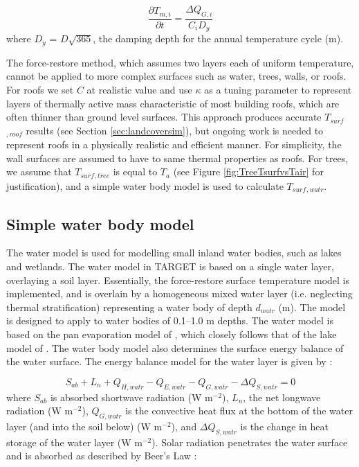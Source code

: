 \documentclass[journal abbreviation, manuscript]{copernicus}
\begin{document}
\begin{equation} 
\frac{\partial T_{m,i}}{\partial t} = \frac{\Delta \ensuremath{Q_{G,i}}}{C_{i} D_{y}}
\label{eq:tm} \end{equation} where \ensuremath{D_{y}} = $D \sqrt{365}$, the damping depth for the annual temperature cycle (m). 

The force-restore method, which assumes two layers each of uniform temperature, cannot be applied to more complex surfaces such as water, trees, walls, or roofs. For  roofs  we set \ensuremath{C} at realistic value and use \ensuremath{\kappa} as a tuning parameter to represent layers of thermally active mass characteristic of most building roofs, which are often thinner than ground level surfaces.  This approach produces accurate $T_{surf}$$_{,roof}$ results (see Section \ref{sec:landcoversim}), but ongoing work is needed to represent roofs in a physically realistic  and  efficient manner. For simplicity, the wall surfaces are assumed to have to same thermal properties as roofs. For trees, we assume that $T_{surf}$$_{,tree}$ is equal to \ensuremath{T_{a}} (see Figure \ref{fig:TreeTsurfvsTair} for justification), and a simple water body model is used to calculate $T_{surf}$$_{,watr}$.


\subsection{Simple water body model}\label{sec:simplewater}

The water model is used for modelling small inland water bodies, such as lakes and wetlands. The water model in  TARGET is based on a single water layer, overlaying a soil layer. Essentially, the force-restore surface temperature model is implemented, and is overlain by a homogeneous mixed water layer (i.e. neglecting thermal stratification) representing a water body of depth \ensuremath{d_{watr}} (m). The model is designed to apply to water bodies of 0.1--1.0 m depths. The water model is based on the pan evaporation model of \cite{MolinaMartinez2006}, which closely follows that of the lake model of \cite{Jacobs1998}. The water body model also determines the surface energy balance of the water surface. The energy balance model for the water layer is given by \cite{MolinaMartinez2006}:

\begin{equation} 
\ensuremath{S_{ab}} + \ensuremath{L_{n}} + \ensuremath{Q_{H,watr}} - \ensuremath{Q_{E,watr}} - \ensuremath{Q_{G,watr}} -\ensuremath{\Delta Q_{S,watr}} = 0
\label{eq:sab} \end{equation} where \ensuremath{S_{ab}} is absorbed shortwave radiation (W m$^{-2}$), \ensuremath{L_{n}}, the net longwave radiation (W m$^{-2}$), \ensuremath{Q_{G,watr}} is the convective heat flux at the bottom of the water layer (and into the soil below) (W m$^{-2}$), and \ensuremath{\Delta Q_{S,watr}} is the change in heat storage of the water layer (W m$^{-2}$). Solar radiation penetrates the water surface and is absorbed as described by Beer's Law \citep{MolinaMartinez2006}:
\end{document}
